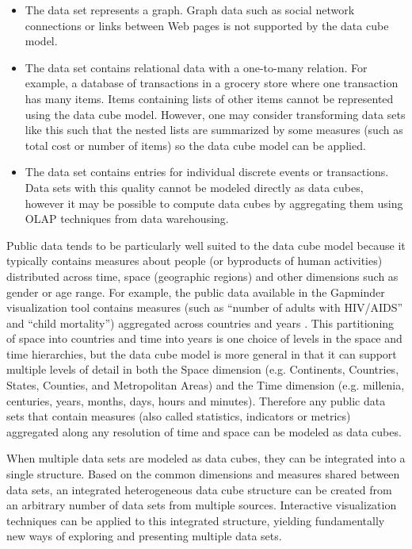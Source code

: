 \documentclass[12pt]{article}
\begin{document}
\begin{doublespace}
\begin{itemize}
\item The data set represents a graph. Graph data such as social network connections or links between Web pages is not supported by the data cube model.
\item The data set contains relational data with a one-to-many relation. For example, a database of transactions in a grocery store where one transaction has many items. Items containing lists of other items cannot be represented using the data cube model. However, one may consider transforming data sets like this such that the nested lists are summarized by some measures (such as total cost or number of items) so the data cube model can be applied.
\item The data set contains entries for individual discrete events or transactions. Data sets with this quality cannot be modeled directly as data cubes, however it may be possible to compute data cubes by aggregating them using OLAP techniques from data warehousing.
\end{itemize}

Public data tends to be particularly well suited to the data cube model because it typically contains measures about people (or byproducts of human activities) distributed across time, space (geographic regions) and other dimensions such as gender or age range. For example, the public data available in the Gapminder visualization tool contains measures (such as ``number of adults with HIV/AIDS'' and ``child mortality'') aggregated across countries and years \cite{gapminderData}. This partitioning of space into countries and time into years is one choice of levels in the space and time hierarchies, but the data cube model is more general in that it can support multiple levels of detail in both the Space dimension (e.g. Continents, Countries, States, Counties, and Metropolitan Areas) and the Time dimension (e.g. millenia, centuries, years, months, days, hours and minutes). Therefore any public data sets that contain measures (also called statistics, indicators or metrics) aggregated along any resolution of time and space can be modeled as data cubes.

When multiple data sets are modeled as data cubes, they can be integrated into a single structure. Based on the common dimensions and measures shared between data sets, an integrated heterogeneous data cube structure can be created from an arbitrary number of data sets from multiple sources. Interactive visualization techniques can be applied to this integrated structure, yielding fundamentally new ways of exploring and presenting multiple data sets.


\end{doublespace}
\end{document}
